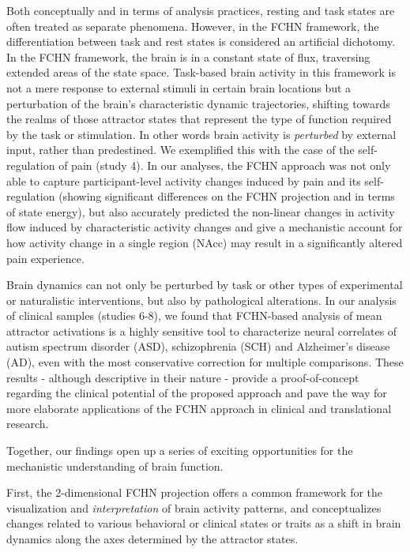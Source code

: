 \documentclass{article}
\begin{document}
Both conceptually and in terms of analysis practices, resting and task states are often treated as separate phenomena. However, in the FCHN framework, the differentiation between task and rest states is considered an artificial dichotomy.
In the FCHN framework, the brain is in a constant state of flux, traversing extended areas of the state space. Task-based brain activity in this framework is not a mere response to external stimuli in certain brain locations but a perturbation of the brain's characteristic dynamic trajectories, shifting towards the realms of those attractor states that represent the type of function required by the task or stimulation. In other words brain activity is \textit{perturbed} by external input, rather than predestined. We exemplified this with the case of the self-regulation of pain (study 4).
In our analyses, the FCHN approach was not only able to capture participant-level activity changes induced by pain and its self-regulation (showing significant differences on the FCHN projection and in terms of state energy), but also accurately predicted the non-linear changes in activity flow induced by characteristic activity changes and give a mechanistic account for how activity change in a single region (NAcc) may result in a significantly altered pain experience.

Brain dynamics can not only be perturbed by task or other types of experimental or naturalistic interventions, but also by pathological alterations. In our analysis of clinical samples (studies 6-8), we found that FCHN-based analysis of mean attractor activations is a highly sensitive tool to characterize neural correlates of autism spectrum disorder (ASD), schizophrenia (SCH) and Alzheimer's disease (AD), even with the most conservative correction for multiple comparisons. These results - although descriptive in their nature - provide a proof-of-concept regarding the clinical potential of the proposed approach and pave the way for more elaborate applications of the FCHN approach in clinical and translational research.

Together, our findings open up a series of exciting opportunities for the mechanistic understanding of brain function.

First, the 2-dimensional FCHN projection offers a common framework for the visualization and \textit{interpretation} of brain activity patterns, and conceptualizes changes related to various behavioral or clinical states or traits as a shift in brain dynamics along the axes determined by the attractor states.
\end{document}
